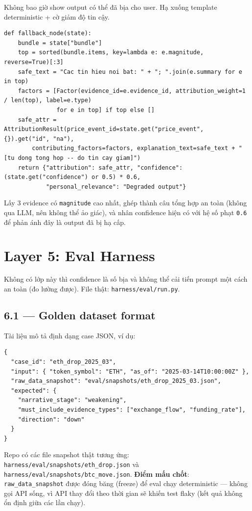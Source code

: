 \documentclass[12pt,a4paper]{article}
\newcommand{\file}[1]{\texttt{#1}}
\begin{document}
Không bao giờ show output có thể đã bịa cho user. Hạ xuống template deterministic + cờ giảm độ
tin cậy.

\begin{lstlisting}
def fallback_node(state):
    bundle = state["bundle"]
    top = sorted(bundle.items, key=lambda e: e.magnitude, reverse=True)[:3]
    safe_text = "Cac tin hieu noi bat: " + "; ".join(e.summary for e in top)
    factors = [Factor(evidence_id=e.evidence_id, attribution_weight=1 / len(top), label=e.type)
               for e in top] if top else []
    safe_attr = AttributionResult(price_event_id=state.get("price_event", {}).get("id", "na"),
        contributing_factors=factors, explanation_text=safe_text + " [tu dong tong hop -- do tin cay giam]")
    return {"attribution": safe_attr, "confidence": (state.get("confidence") or 0.5) * 0.6,
            "personal_relevance": "Degraded output"}
\end{lstlisting}

Lấy 3 evidence có \texttt{magnitude} cao nhất, ghép thành câu tổng hợp an toàn (không qua LLM, nên
không thể ảo giác), và nhân confidence hiện có với hệ số phạt \texttt{0.6} để phản ánh đây là
output đã bị hạ cấp.

\section{Layer 5: Eval Harness}

Không có lớp này thì confidence là số bịa và không thể cải tiến prompt một cách an toàn (đo lường
được). File thật: \file{harness/eval/run.py}.

\subsection{6.1 --- Golden dataset format}

Tài liệu mô tả định dạng case JSON, ví dụ:
\begin{lstlisting}
{
  "case_id": "eth_drop_2025_03",
  "input": { "token_symbol": "ETH", "as_of": "2025-03-14T10:00:00Z" },
  "raw_data_snapshot": "eval/snapshots/eth_drop_2025_03.json",
  "expected": {
    "narrative_stage": "weakening",
    "must_include_evidence_types": ["exchange_flow", "funding_rate"],
    "direction": "down"
  }
}
\end{lstlisting}
Repo có các file snapshot thật tương ứng: \file{harness/eval/snapshots/eth\_drop.json} và
\file{harness/eval/snapshots/btc\_move.json}. \textbf{Điểm mấu chốt}: \texttt{raw\_data\_snapshot}
được đóng băng (freeze) để eval chạy deterministic --- không gọi API sống, vì API thay đổi theo
thời gian sẽ khiến test flaky (kết quả không ổn định giữa các lần chạy).
\end{document}
